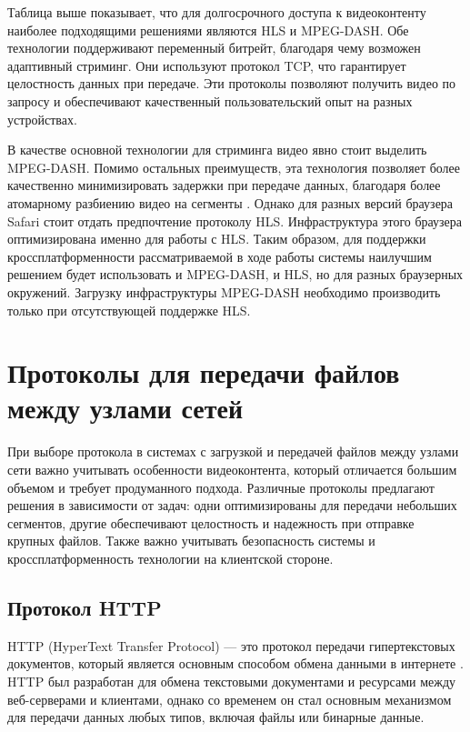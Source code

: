 	Таблица выше показывает, что для долгосрочного доступа к видеоконтенту наиболее подходящими решениями являются HLS и MPEG-DASH. Обе технологии поддерживают переменный битрейт, благодаря чему возможен адаптивный стриминг. Они используют протокол TCP, что гарантирует целостность данных при передаче. Эти протоколы позволяют получить видео по запросу и обеспечивают качественный пользовательский опыт на разных устройствах.
	
	В качестве основной технологии для стриминга видео явно стоит выделить MPEG-DASH. Помимо остальных преимуществ, эта технология позволяет более качественно минимизировать задержки при передаче данных, благодаря более атомарному разбиению видео на сегменты \cite{bouzakariaLowLatencyDash}. Однако для разных версий браузера Safari стоит отдать предпочтение протоколу HLS. Инфраструктура этого браузера оптимизирована именно для работы с HLS. Таким образом, для поддержки кроссплатформенности рассматриваемой в ходе работы системы наилучшим решением будет использовать и MPEG-DASH, и HLS, но для разных браузерных окружений. Загрузку инфраструктуры MPEG-DASH необходимо производить только при отсутствующей поддержке HLS.

\section{Протоколы для передачи файлов между узлами сетей}
	При выборе протокола в системах с загрузкой и передачей файлов между узлами сети важно учитывать особенности видеоконтента, который отличается большим объемом и требует продуманного подхода. Различные протоколы предлагают решения в зависимости от задач: одни оптимизированы для передачи небольших сегментов, другие обеспечивают целостность и надежность при отправке крупных файлов. Также важно учитывать безопасность системы и кроссплатформенность технологии на клиентской стороне.

\subsection{Протокол HTTP}
	HTTP (HyperText Transfer Protocol) — это протокол передачи гипертекстовых документов, который является основным способом обмена данными в интернете \cite{rfcHttp10}. HTTP был разработан для обмена текстовыми документами и ресурсами между веб-серверами и клиентами, однако со временем он стал основным механизмом для передачи данных любых типов, включая файлы или бинарные данные.
	
